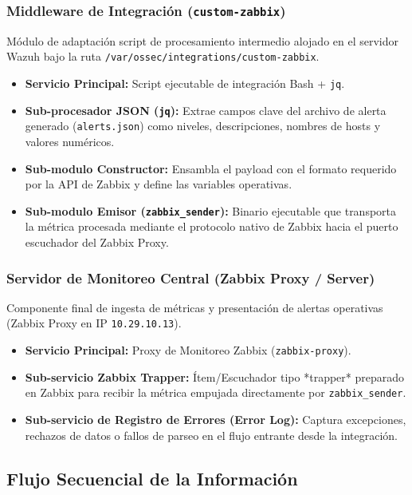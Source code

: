 \subsubsection{Middleware de Integración (\texttt{custom-zabbix})}
Módulo de adaptación script de procesamiento intermedio alojado en el servidor Wazuh bajo la ruta \texttt{/var/ossec/integrations/custom-zabbix}.

\begin{itemize}
    \item \textbf{Servicio Principal:} Script ejecutable de integración Bash + \texttt{jq}.
    \item \textbf{Sub-procesador JSON (\texttt{jq}):} Extrae campos clave del archivo de alerta generado (\texttt{alerts.json}) como niveles, descripciones, nombres de hosts y valores numéricos.
    \item \textbf{Sub-modulo Constructor:} Ensambla el payload con el formato requerido por la API de Zabbix y define las variables operativas.
    \item \textbf{Sub-modulo Emisor (\texttt{zabbix\_sender}):} Binario ejecutable que transporta la métrica procesada mediante el protocolo nativo de Zabbix hacia el puerto escuchador del Zabbix Proxy.
\end{itemize}

\subsubsection{Servidor de Monitoreo Central (Zabbix Proxy / Server)}
Componente final de ingesta de métricas y presentación de alertas operativas (Zabbix Proxy en IP \texttt{10.29.10.13}).

\begin{itemize}
    \item \textbf{Servicio Principal:} Proxy de Monitoreo Zabbix (\texttt{zabbix-proxy}).
    \item \textbf{Sub-servicio Zabbix Trapper:} Ítem/Escuchador tipo *trapper* preparado en Zabbix para recibir la métrica empujada directamente por \texttt{zabbix\_sender}.
    \item \textbf{Sub-servicio de Registro de Errores (Error Log):} Captura excepciones, rechazos de datos o fallos de parseo en el flujo entrante desde la integración.
\end{itemize}

\subsection{Flujo Secuencial de la Información}

